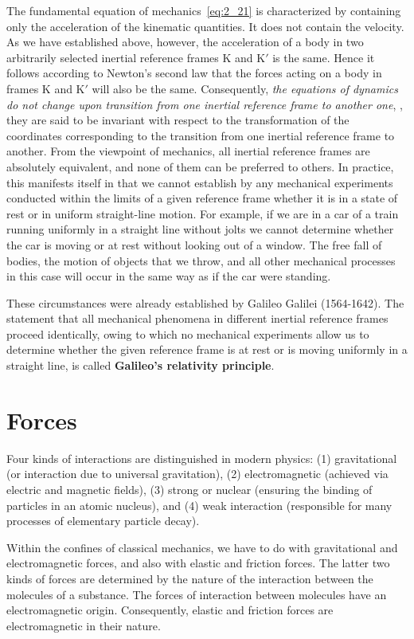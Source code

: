 The fundamental equation of mechanics~\eqref{eq:2_21} is characterized by containing only the acceleration of the kinematic quantities. It does not contain the velocity. As we have established above, however, the acceleration of a body in two arbitrarily selected inertial reference frames K and K$'$ is the same. Hence it follows according to Newton's second law that the forces acting on a body in frames K and K$'$ will also be the same. Consequently, \textit{the equations of dynamics do not change upon transition from one inertial reference frame to another one}, \ie, they are said to be invariant with respect to the transformation of the coordinates corresponding to the transition from one inertial reference frame to another. From the viewpoint of mechanics, all inertial reference frames are absolutely equivalent, and none of them can be preferred to others. In practice, this manifests itself in that we cannot establish by any mechanical experiments conducted within the limits of a given reference frame whether it is in a state of rest or in uniform straight-line motion. For example, if we are in a car of a train running uniformly in a straight line without jolts we cannot determine whether the car is moving or at rest without looking out of a window. The free fall of bodies, the motion of objects that we throw, and all other mechanical processes in this case will occur in the same way as if the car were standing.

These circumstances were already established by Galileo Galilei (1564-1642). The statement that all mechanical phenomena in different inertial reference frames proceed identically, owing to which no mechanical experiments allow us to determine whether the given reference frame is at rest or is moving uniformly in a straight line, is called \textbf{Galileo's relativity principle}.

\section{Forces}\label{sec:2_8}

Four kinds of interactions are distinguished in modern physics: (1) gravitational (or interaction due to universal gravitation), (2) electromagnetic (achieved via electric and magnetic fields), (3) strong or nuclear (ensuring the binding of particles in an atomic nucleus), and (4) weak interaction (responsible for many processes of elementary particle decay).

Within the confines of classical mechanics, we have to do with gravitational and electromagnetic forces, and also with elastic and friction forces. The latter two kinds of forces are determined by the nature of the interaction between the molecules of a substance. The forces of interaction between molecules have an electromagnetic origin. Consequently, elastic and friction forces are electromagnetic in their nature.

